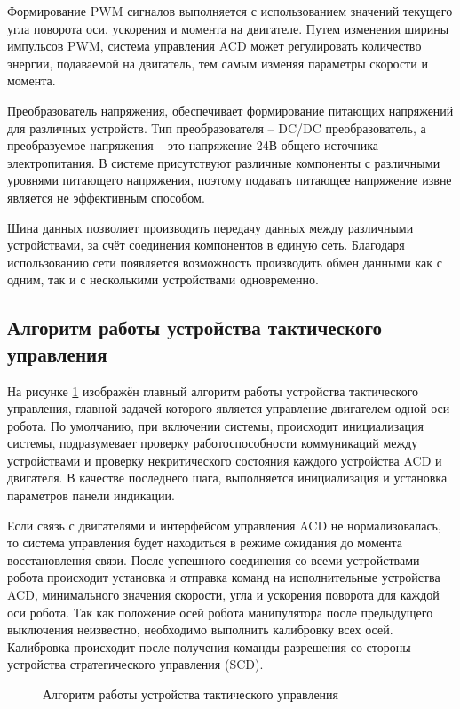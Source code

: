 Формирование PWM сигналов выполняется с использованием значений текущего угла поворота оси, ускорения и момента на двигателе. Путем изменения ширины импульсов PWM, система управления ACD может регулировать количество энергии, подаваемой на двигатель, тем самым изменяя параметры скорости и момента.

Преобразователь напряжения, обеспечивает формирование питающих напряжений для различных устройств. Тип преобразователя – DC/DC преобразователь, а преобразуемое напряжения – это напряжение 24В общего источника электропитания. В системе присутствуют различные компоненты с различными уровнями питающего напряжения, поэтому подавать питающее напряжение извне является не эффективным способом.

Шина данных позволяет производить передачу данных между различными устройствами, за счёт соединения компонентов в единую сеть. Благодаря использованию сети появляется возможность производить обмен данными как с одним, так и с несколькими устройствами одновременно. 

\subsection{Алгоритм работы устройства тактического управления}
На рисунке \ref{AlgTCD} изображён главный алгоритм работы устройства тактического управления, главной задачей которого является управление двигателем одной оси робота. По умолчанию, при включении системы, происходит инициализация системы, подразумевает проверку работоспособности коммуникаций между устройствами и проверку некритического состояния каждого устройства ACD и двигателя. В качестве последнего шага, выполняется инициализация и установка параметров панели индикации.

Если связь с двигателями и интерфейсом управления ACD не нормализовалась, то система управления будет находиться в режиме ожидания до момента восстановления связи. После успешного соединения со всеми устройствами робота происходит установка и отправка команд на исполнительные устройства ACD, минимального значения скорости, угла и ускорения поворота для каждой оси робота. Так как положение осей робота манипулятора после предыдущего выключения неизвестно, необходимо выполнить калибровку всех осей. Калибровка происходит после получения команды разрешения со стороны устройства стратегического управления (SCD).

\begin{figure}[H]
	\centering
	
	\caption{Алгоритм работы устройства тактического управления}
	\label{AlgTCD}
\end{figure}

